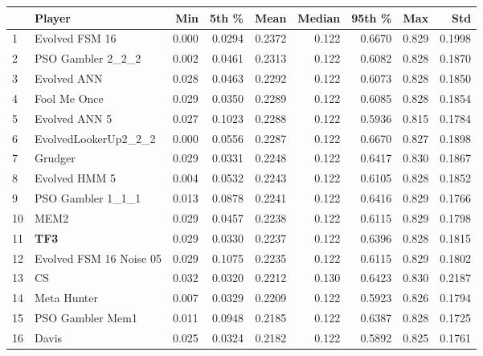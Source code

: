 \begin{tabular}{llrrrrrrr}
\toprule
{} &                   Player &    Min &   5th \% &    Mean &  Median &  95th \% &    Max &     Std \\
\midrule
1  &           Evolved FSM 16 &  0.000 &  0.0294 &  0.2372 &   0.122 &  0.6670 &  0.829 &  0.1998 \\
2  &        PSO Gambler 2\_2\_2 &  0.002 &  0.0461 &  0.2313 &   0.122 &  0.6082 &  0.828 &  0.1870 \\
3  &              Evolved ANN &  0.028 &  0.0463 &  0.2292 &   0.122 &  0.6073 &  0.828 &  0.1850 \\
4  &             Fool Me Once &  0.029 &  0.0350 &  0.2289 &   0.122 &  0.6085 &  0.828 &  0.1854 \\
5  &            Evolved ANN 5 &  0.027 &  0.1023 &  0.2288 &   0.122 &  0.5936 &  0.815 &  0.1784 \\
6  &     EvolvedLookerUp2\_2\_2 &  0.000 &  0.0556 &  0.2287 &   0.122 &  0.6670 &  0.827 &  0.1898 \\
7  &                  Grudger &  0.029 &  0.0331 &  0.2248 &   0.122 &  0.6417 &  0.830 &  0.1867 \\
8  &            Evolved HMM 5 &  0.004 &  0.0532 &  0.2243 &   0.122 &  0.6105 &  0.828 &  0.1852 \\
9  &        PSO Gambler 1\_1\_1 &  0.013 &  0.0878 &  0.2241 &   0.122 &  0.6416 &  0.829 &  0.1766 \\
10 &                     MEM2 &  0.029 &  0.0457 &  0.2238 &   0.122 &  0.6115 &  0.829 &  0.1798 \\
11 &                      \textbf{TF3} &  0.029 &  0.0330 &  0.2237 &   0.122 &  0.6396 &  0.828 &  0.1815 \\
12 &  Evolved FSM 16 Noise 05 &  0.029 &  0.1075 &  0.2235 &   0.122 &  0.6115 &  0.829 &  0.1802 \\
13 &                       CS &  0.032 &  0.0320 &  0.2212 &   0.130 &  0.6423 &  0.830 &  0.2187 \\
14 &              Meta Hunter &  0.007 &  0.0329 &  0.2209 &   0.122 &  0.5923 &  0.826 &  0.1794 \\
15 &         PSO Gambler Mem1 &  0.011 &  0.0948 &  0.2185 &   0.122 &  0.6387 &  0.828 &  0.1725 \\
16 &                    Davis &  0.025 &  0.0324 &  0.2182 &   0.122 &  0.5892 &  0.825 &  0.1761 \\
\bottomrule
\end{tabular}
